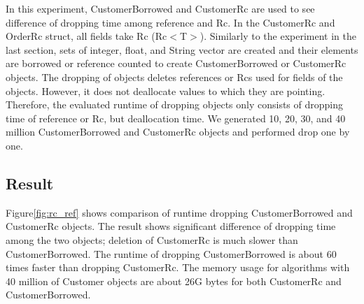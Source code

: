 

In this experiment, CustomerBorrowed and CustomerRc are used to see difference of dropping time among reference and Rc. 
In the CustomerRc and OrderRc struct, all fields take Rc (Rc$<$T$>$). Similarly to the experiment in the last section, 
sets of integer, float, and String vector are created and their elements are borrowed or reference counted to create CustomerBorrowed or CustomerRc objects.
The dropping of objects deletes references or Rcs used for fields of the objects. However, it does not deallocate values to which they are pointing. 
Therefore, the evaluated runtime of dropping objects only consists of dropping time of reference or Rc, but deallocation time.
We generated 10, 20, 30, and 40 million CustomerBorrowed and CustomerRc objects and performed drop one by one. 

\subsection{Result}
Figure\ref{fig:rc_ref} shows comparison of runtime dropping CustomerBorrowed and CustomerRc objects. 
The result shows significant difference of dropping time among the two objects; deletion of CustomerRc is much slower than CustomerBorrowed. 
The runtime of dropping CustomerBorrowed is about 60 times faster than dropping CustomerRc. 
The memory usage for algorithms with 40 million of Customer objects are about 26G bytes for both CustomerRc and CustomerBorrowed.

